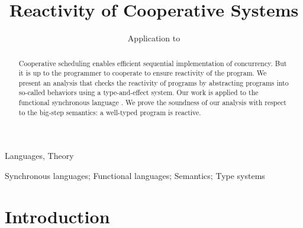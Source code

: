 \documentclass[9pt,preprint]{sigplanconf}
\begin{document}
\newtheorem{theorem}{Theorem}[section]
\newtheorem{property}{Property}
\newtheorem{lemma}{Lemma}
\newtheorem*{hypothesis}{Hypothesis}

\theoremstyle{definition}
\newtheorem{definition}{Definition}

\title{Reactivity of Cooperative Systems}
\subtitle{Application to \rml}

\authorinfo{}{}{}

\maketitle

\begin{abstract}
Cooperative scheduling enables efficient sequential implementation of concurrency. But it is up to the programmer to cooperate to ensure reactivity of the program. We present an analysis that checks the reactivity of programs by abstracting programs into so-called behaviors using a type-and-effect system. Our work is applied to the functional synchronous language \rml. We prove the soundness of our analysis with respect to the big-step semantics: a well-typed program is reactive.
\end{abstract}


\terms
Languages, Theory

\keywords
Synchronous languages; Functional languages;  Semantics; Type systems

\section{Introduction}
\label{sec:introduction}
\end{document}
